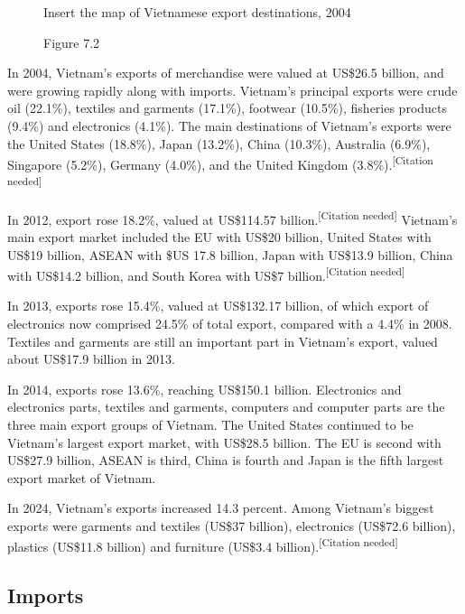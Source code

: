 \documentclass[openany]{book}
\begin{document}
\begin{figure}
    \begin{framed}
    Insert the map of Vietnamese export destinations, 2004
    \caption*{Figure 7.2}    
    \end{framed}
    
\end{figure}

In 2004, Vietnam's exports of merchandise were valued at US\$26.5 billion, and were growing rapidly along with imports. Vietnam's principal exports were crude oil (22.1\%), textiles and garments (17.1\%), footwear (10.5\%), fisheries products (9.4\%) and electronics (4.1\%). The main destinations of Vietnam's exports were the United States (18.8\%), Japan (13.2\%), China (10.3\%), Australia (6.9\%), Singapore (5.2\%), Germany (4.0\%), and the United Kingdom (3.8\%).\textsuperscript{[Citation needed]}

In 2012, export rose 18.2\%, valued at US\$114.57 billion.\textsuperscript{[Citation needed]} Vietnam's main export market included the EU with US\$20 billion, United States with US\$19 billion, ASEAN with \$US 17.8 billion, Japan with US\$13.9 billion, China with US\$14.2 billion, and South Korea with US\$7 billion.\textsuperscript{[Citation needed]}

In 2013, exports rose 15.4\%, valued at US\$132.17 billion, of which export of electronics now comprised 24.5\% of total export, compared with a 4.4\% in 2008. Textiles and garments are still an important part in Vietnam's export, valued about US\$17.9 billion in 2013.

In 2014, exports rose 13.6\%, reaching US\$150.1 billion. Electronics and electronics parts, textiles and garments, computers and computer parts are the three main export groups of Vietnam. The United States continued to be Vietnam's largest export market, with US\$28.5 billion. The EU is second with US\$27.9 billion, ASEAN is third, China is fourth and Japan is the fifth largest export market of Vietnam.

In 2024, Vietnam's exports increased 14.3 percent. Among Vietnam's biggest exports were garments and textiles (US\$37 billion), electronics (US\$72.6 billion), plastics (US\$11.8 billion) and furniture (US\$3.4 billion).\textsuperscript{[Citation needed]}

\subsection{Imports}
\end{document}
